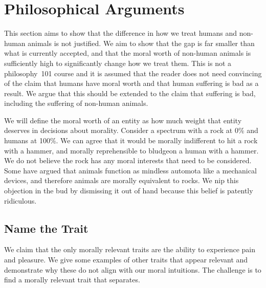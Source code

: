 


\section{Philosophical Arguments}
\label{sec:PhilosophicalArguments}

This section aims to show that the difference in how we treat humans and non-human animals is not justified. We aim to show that the gap is far smaller than what is currently accepted, and that the moral worth of non-human animals is sufficiently high to significantly change how we treat them. This is not a philosophy~101 course and it is assumed that the reader does not need convincing of the claim that humans have moral worth and that human suffering is bad as a result. We argue that this should be extended to the claim that suffering is bad, including the suffering of non-human animals.

We will define the moral worth of an entity as how much weight that entity deserves in decisions about morality. Consider a spectrum with a rock at 0\% and humans at 100\%. We can agree that it would be morally indifferent to hit a rock with a hammer, and morally reprehensible to bludgeon a human with a hammer. We do not believe the rock has any moral interests that need to be considered. Some have argued that animals function as mindless automota like a mechanical devices, and therefore animals are morally equivalent to rocks. We nip this objection in the bud by dismissing it out of hand because this belief is patently ridiculous.

\subsection{Name the Trait}

We claim that the only morally relevant traits are the ability to experience pain and pleasure. We give some examples of other traits that appear relevant and demonstrate why these do not align with our moral intuitions. The challenge is to find a morally relevant trait that separates.

